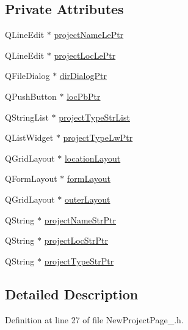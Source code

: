 \subsection*{Private Attributes}
\begin{DoxyCompactItemize}
\item 
Q\-Line\-Edit $\ast$ \hyperlink{class_new_project_page__2_a8d955d78824c84ca7943b1af2ace11b0}{project\-Name\-Le\-Ptr}
\item 
Q\-Line\-Edit $\ast$ \hyperlink{class_new_project_page__2_a86200aed0b692c71dffa0664fa18e25e}{project\-Loc\-Le\-Ptr}
\item 
Q\-File\-Dialog $\ast$ \hyperlink{class_new_project_page__2_a8cf80ba2a09ce1963365aae0f65a65e7}{dir\-Dialog\-Ptr}
\item 
Q\-Push\-Button $\ast$ \hyperlink{class_new_project_page__2_ab5056e3d84ca52cffb2842c398ee04b2}{loc\-Pb\-Ptr}
\item 
Q\-String\-List $\ast$ \hyperlink{class_new_project_page__2_a1206183c60275d0189a9a1ec78d3ad2b}{project\-Type\-Str\-List}
\item 
Q\-List\-Widget $\ast$ \hyperlink{class_new_project_page__2_aca414e3a3ca361ef6b24d6f849bc1bca}{project\-Type\-Lw\-Ptr}
\item 
Q\-Grid\-Layout $\ast$ \hyperlink{class_new_project_page__2_a17fd912b11ae2dad02da7fa3906f948d}{location\-Layout}
\item 
Q\-Form\-Layout $\ast$ \hyperlink{class_new_project_page__2_afc89c432c8c3cd4740e4a98bbe5f426b}{form\-Layout}
\item 
Q\-Grid\-Layout $\ast$ \hyperlink{class_new_project_page__2_a59c64379dca8c4bf52e60503b76da65e}{outer\-Layout}
\item 
Q\-String $\ast$ \hyperlink{class_new_project_page__2_ad3fb4b5248b01e40660cbb91ebd215c9}{project\-Name\-Str\-Ptr}
\item 
Q\-String $\ast$ \hyperlink{class_new_project_page__2_aeef81f262fde93b45f7264515bee334d}{project\-Loc\-Str\-Ptr}
\item 
Q\-String $\ast$ \hyperlink{class_new_project_page__2_a11cf2e27845bca28160711333975f68c}{project\-Type\-Str\-Ptr}
\end{DoxyCompactItemize}


\subsection{Detailed Description}


Definition at line 27 of file New\-Project\-Page\-\_.\-h.



